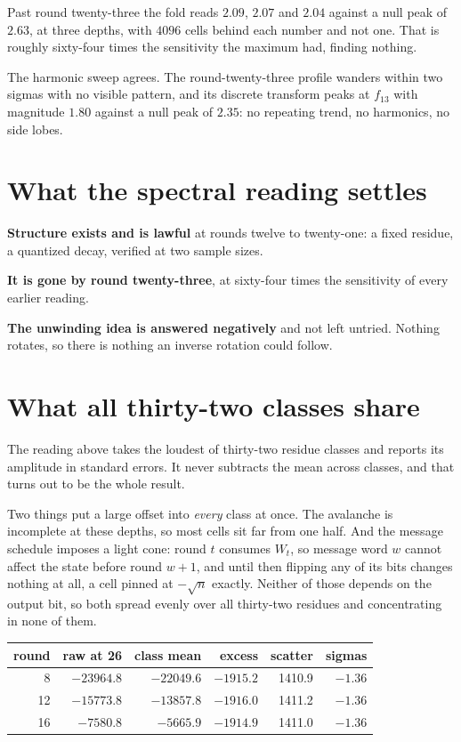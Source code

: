 Past round twenty-three the fold reads \(2.09\), \(2.07\) and \(2.04\) against a null peak of \(2.63\), at three depths, with \(4096\) cells behind each number and not one. That is roughly sixty-four times the sensitivity the maximum had, finding nothing.

The harmonic sweep agrees. The round-twenty-three profile wanders within two sigmas with no visible pattern, and its discrete transform peaks at \(f_{13}\) with magnitude \(1.80\) against a null peak of \(2.35\): no repeating trend, no harmonics, no side lobes.

\section{What the spectral reading settles}

\textbf{Structure exists and is lawful} at rounds twelve to twenty-one: a fixed residue, a quantized decay, verified at two sample sizes.

\textbf{It is gone by round twenty-three}, at sixty-four times the sensitivity of every earlier reading.

\textbf{The unwinding idea is answered negatively} and not left untried. Nothing rotates, so there is nothing an inverse rotation could follow.

\section{What all thirty-two classes share}
\label{sec:commonmode}

The reading above takes the loudest of thirty-two residue classes and reports its amplitude in
standard errors. It never subtracts the mean across classes, and that turns out to be the whole
result.

Two things put a large offset into \emph{every} class at once. The avalanche is incomplete at these
depths, so most cells sit far from one half. And the message schedule imposes a light cone: round
\(t\) consumes \(W_t\), so message word \(w\) cannot affect the state before round \(w+1\), and
until then flipping any of its bits changes nothing at all, a cell pinned at \(-\sqrt{n}\)
exactly. Neither of those depends on the output bit, so both spread evenly over all thirty-two
residues and concentrating in none of them.

\begin{center}
\begin{tabular}{rrrrrr}
\toprule
round & raw at 26 & class mean & excess & scatter & sigmas \\
\midrule
8 & \(-23964.8\) & \(-22049.6\) & \(-1915.2\) & 1410.9 & \(-1.36\) \\
12 & \(-15773.8\) & \(-13857.8\) & \(-1916.0\) & 1411.2 & \(-1.36\) \\
16 & \(-7580.8\) & \(-5665.9\) & \(-1914.9\) & 1411.0 & \(-1.36\) \\
\bottomrule
\end{tabular}
\end{center}

